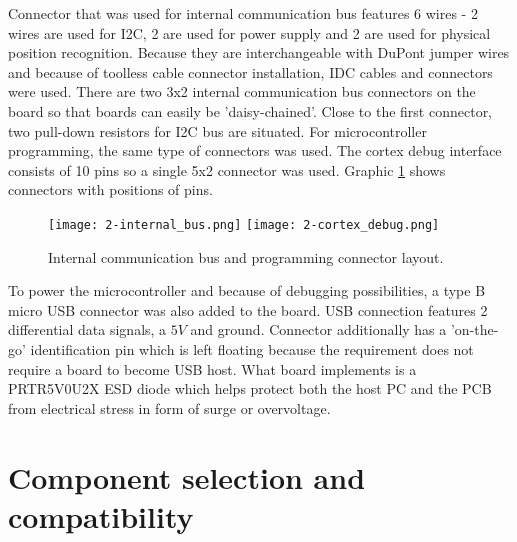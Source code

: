 Connector that was used for internal communication bus features 6 wires - 2 wires are used for \ac{I2C}, 2 are used for power supply and 2 are used for physical position recognition. Because they are interchangeable with DuPont jumper wires and because of toolless cable connector installation, \ac{IDC} cables and connectors were used\cite{IDC}. There are two 3x2 internal communication bus connectors on the board so that boards can easily be 'daisy-chained'. Close to the first connector, two pull-down resistors for I2C bus are situated. For microcontroller programming, the same type of connectors was used. The cortex debug interface consists of 10 pins so a single 5x2 connector was used. Graphic \ref{fig:connectors} shows connectors with positions of pins.

\begin{figure}[h]
  \begin{center}
    \texttt{[image: 2-internal\_bus.png]}
    \hspace{1cm}
    \texttt{[image: 2-cortex\_debug.png]}
  \end{center}
  \caption{Internal communication bus and programming connector layout.}
  \label{fig:connectors}
\end{figure}


To power the microcontroller and because of debugging possibilities, a type B micro \ac{USB} connector was also added to the board. \ac{USB} connection features 2 differential data signals, a $5V$ and ground. Connector additionally has a 'on-the-go' identification pin which is left floating because the requirement does not require a board to become \ac{USB} host. What board implements is a PRTR5V0U2X \ac{ESD} diode\cite{PRTR} which helps protect both the host \ac{PC} and the \ac{PCB} from electrical stress in form of surge or overvoltage.


\section{Component selection and compatibility}

